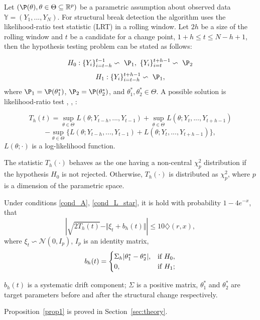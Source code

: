 \label{sec:algorithm}

Let $(\P(\theta), \theta \in \Theta \subseteq \mathbb{R}^p)$ be a parametric assumption about observed data $\mathbb{Y} = (Y_1,...,Y_N)$.
For structural break detection the algorithm uses the likelihood-ratio test statistic (LRT) in a rolling window.
Let $2h$ be a size of the rolling window and $t$ be a candidate for a change point, $1 + h \leq t \leq N - h + 1$, then 
the hypothesis testing problem can be stated as follows:

\[H_0: \{Y_i\}_{i = t - h}^{t - 1} \backsim ~\P_1, ~ \{Y_i\}_{i = t}^{t + h - 1} \backsim~ \P_2
\]
\[
H_1: \{Y_i\}_{i=t - h}^{t + h - 1} \backsim ~\P_1,
\]
where $\P_1 = \P(\theta^*_1)$, $\P_2 = \P(\theta^*_2)$, and $\theta^*_1, \theta^*_2 \in \Theta$.
A possible solution is likelihood-ratio test \citet{GLR_Siegm}, \citet{LRTWilks}, \citet{nonParamMLE}: 

\[
T_{h}(t) = \sup_{\theta \in \Theta}L(\theta; Y_{t-h},..., Y_{t-1}) + \sup_{\theta \in \Theta}L(\theta; Y_{t},...,
Y_{t+h-1})
\]
\[
-\sup_{\theta \in \Theta}\{L(\theta; Y_{t-h},..., Y_{t-1}) + L(\theta; Y_{t},..., Y_{t+h-1})\},
\]
$L(\theta;\cdot)$ is a log-likelihood function.


The statistic $T_h(\cdot)$ behaves as the one having a non-central $\chi^2_p$ distribution if the hypothesis $H_0$ is not rejected. Otherwise, $T_h(\cdot)$ is distributed as $\chi^2_p$, where $p$ is a dimension of the parametric space. 

\begin{proposition}
\label{prop1}
Under conditions \ref{cond_A}, \ref{cond_L_star}, it is hold with probability $1 - 4 e^{-x}$, that 
\[
|\sqrt{2 T_h(t)} - \Vert  \xi_t + b_h(t)\Vert|  \leq 10 \diamondsuit (r, x),
\]
where $\xi_t \backsim \mathcal{N}(0, I_p)$, $I_p$ is an identity matrix,
\[
  b_h(t) = \begin{cases}
    \Sigma_h|\theta_1^* - \theta_2^*|, & \text{if $H_0$},\\
     $0$ , & \text{if $H_1$};
  \end{cases}
\]

$b_{h}(t)$ is a systematic drift component; $\Sigma$ is a positive matrix, $\theta_1^*$ and $\theta_2^*$  are target parameters before and after the structural change respectively.
\end{proposition}  
Proposition~\ref{prop1} is proved in Section~\ref{sec:theory}.\\

